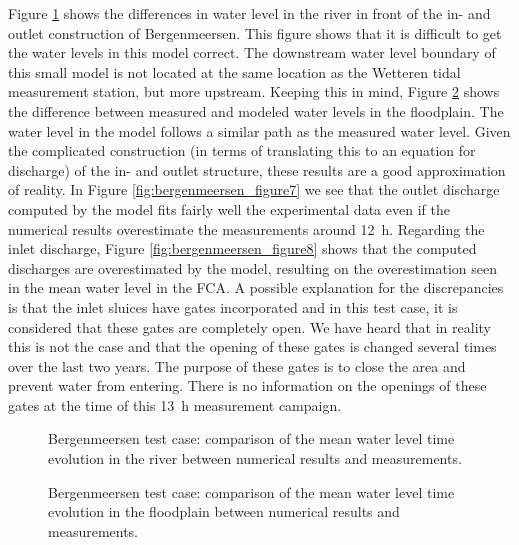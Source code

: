 Figure \ref{fig:bergenmeersen_figure5} shows the differences in water level in
the river in front of the in- and outlet construction of Bergenmeersen.
This figure shows that it is difficult to get the water levels in this model
correct.
The downstream water level boundary of this small model is not located at the
same location as the Wetteren tidal measurement station, but more upstream.
Keeping this in mind, Figure \ref{fig:bergenmeersen_figure6} shows the difference
between measured and modeled water levels in the floodplain.
The water level in the model follows a similar path as the measured water level.
Given the complicated construction (in terms of translating this to an equation
for discharge)
of the in- and outlet structure, these results are a good approximation of reality.
In Figure \ref{fig:bergenmeersen_figure7} we see that the outlet discharge
computed by the model fits fairly well the experimental data even if the
numerical results overestimate the measurements around 12~h.
Regarding the inlet discharge, Figure \ref{fig:bergenmeersen_figure8} shows that
the computed discharges are overestimated by the model, resulting on the
overestimation seen in the mean water level in the FCA.
A possible explanation for the discrepancies is that the inlet sluices have
gates incorporated and in this test case, it is considered that these gates are
completely open.
We have heard that in reality this is not the case and that the opening of these
gates is changed several times over the last two years.
The purpose of these gates is to close the area and prevent water from entering.
There is no information on the openings of these gates at the time of this 13~h
measurement campaign.

\begin{figure}[H]
\begin{center}
\end{center}
\caption{Bergenmeersen test case: comparison of the mean water level time evolution in the
river between numerical results and measurements.}
\label{fig:bergenmeersen_figure5}
\end{figure}

\begin{figure}[H]
\begin{center}
\end{center}
\caption{Bergenmeersen test case: comparison of the mean water level time
evolution in the floodplain between numerical results and measurements.}
\label{fig:bergenmeersen_figure6}
\end{figure}

